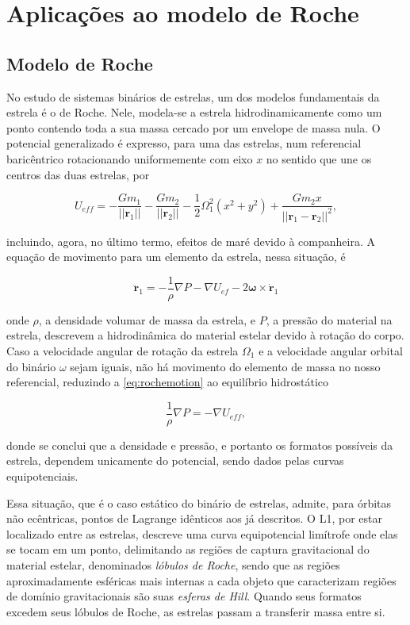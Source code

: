 \section{Aplicações ao modelo de Roche}

\subsection{Modelo de Roche}

No estudo de sistemas binários de estrelas, um dos modelos fundamentais da estrela é o de Roche. Nele, modela-se a estrela hidrodinamicamente como um ponto contendo toda a sua massa cercado por um envelope de massa nula. O potencial generalizado é expresso, para uma das estrelas, num referencial baricêntrico rotacionando uniformemente com eixo $x$ no sentido que une os centros das duas estrelas, por

\begin{equation}
    U_{eff} = -\frac{Gm_1}{||\mathbf{r}_1||}-\frac{Gm_2}{||\mathbf{r}_2||}-\frac{1}{2}\Omega_1^2(x^2 + y^2)+\frac{Gm_2x}{||\mathbf{r}_1 - \mathbf{r}_2||^2},
\end{equation}

incluindo, agora, no último termo, efeitos de maré devido à companheira. A equação de movimento para um elemento da estrela, nessa situação, é

\begin{equation}
    \label{eq:rochemotion}
    \ddot{\mathbf{r}}_1 = -\frac{1}{\rho}\nabla P - \nabla U_{ef} - 2\mathbf{\omega}\times\dot{\mathbf{r}}_1
\end{equation}

onde $\rho$, a densidade volumar de massa da estrela, e $P$, a pressão do material na estrela, descrevem a hidrodinâmica do material estelar devido à rotação do corpo. Caso a velocidade angular de rotação da estrela $\Omega_1$ e a velocidade angular orbital do binário $\omega$ sejam iguais, não há movimento do elemento de massa no nosso referencial, reduzindo a \ref{eq:rochemotion} ao equilíbrio hidrostático

\begin{equation}
    \label{eq:staticroche}
    \frac{1}{\rho}\nabla P = -\nabla U_{eff},
\end{equation}

donde se conclui que a densidade e pressão, e portanto os formatos possíveis da estrela, dependem unicamente do potencial, sendo dados pelas curvas equipotenciais.

Essa situação, que é o caso estático do binário de estrelas, admite, para órbitas não ecêntricas, pontos de Lagrange idênticos aos já descritos. O L1, por estar localizado entre as estrelas, descreve uma curva equipotencial limítrofe onde elas se tocam em um ponto, delimitando as regiões de captura gravitacional do material estelar, denominados \textit{lóbulos de Roche}, sendo que as regiões aproximadamente esféricas mais internas a cada objeto que caracterizam regiões de domínio gravitacionais são suas \textit{esferas de Hill}. Quando seus formatos excedem seus lóbulos de Roche, as estrelas passam a transferir massa entre si.


